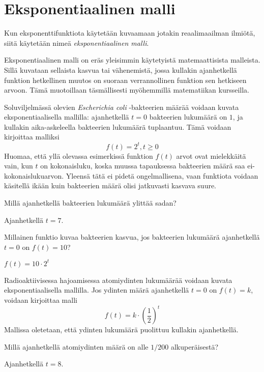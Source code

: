 \section{Eksponentiaalinen malli}

Kun eksponenttifunktiota käytetään kuvaamaan jotakin reaalimaailman
ilmiötä, siitä käytetään nimeä \emph{eksponentiaalinen malli}.

Eksponentiaalinen malli on eräs yleisimmin käytetyistä matemaattisista
malleista. Sillä kuvataan sellaista kasvua tai vähenemistä, jossa
kullakin ajanhetkellä funktion hetkellinen muutos on suoraan
verrannollinen funktion sen hetkiseen arvoon. Tämä muotoillaan
täsmällisesti myöhemmillä matematiikan kursseilla.

\begin{esimerkki}
Soluviljelmässä olevien \emph{Escherichia coli} -bakteerien
määrää voidaan kuvata eksponentiaalisella mallilla: ajanhetkellä
$t = 0$ bakteerien lukumäärä on $1$, ja kullakin aika-askeleella
bakteerien lukumäärä tuplaantuu. Tämä voidaan
kirjoittaa malliksi
\[
f(t) = 2^t, t \ge 0
\]
Huomaa, että yllä olevassa esimerkissä funktion $f(t)$ arvot ovat
mielekkäitä vain, kun $t$ on kokonaisluku, koska
muussa tapauksessa bakteerien määrä saa ei-kokonaislukuarvon.
Yleensä tätä ei pidetä ongelmallisena, vaan funktiota voidaan käsitellä
ikään kuin bakteerien määrä olisi jatkuvasti kasvava suure.
\end{esimerkki}

\begin{tehtava}
Millä ajanhetkellä bakteerien lukumäärä ylittää sadan?
\begin{vastaus}
Ajanhetkellä $t = 7$.
\end{vastaus}
\end{tehtava}

\begin{tehtava}
Millainen funktio kuvaa bakteerien kasvua, jos bakteerien lukumäärä
ajanhetkellä $t = 0$ on $f(t) = 10$?
\begin{vastaus}
$f(t) = 10 \cdot 2^t$
\end{vastaus}
\end{tehtava}

\begin{esimerkki}
Radioaktiivisessa hajoamisessa atomiydinten lukumäärää voidaan
kuvata eksponentiaalisella mallilla. Jos ydinten määrä ajanhetkellä
$t = 0$ on $f(t) = k$, voidaan kirjoittaa malli
\[
f(t) = k \cdot \left( \frac{1}{2} \right)^t
\]
Mallissa oletetaan, että ydinten lukumäärä puolittuu kullakin ajanhetkellä.
\end{esimerkki}

\begin{tehtava}
Millä ajanhetkellä atomiydinten määrä on alle $1/200$ alkuperäisestä?
\begin{vastaus}
Ajanhetkellä $t = 8$.
\end{vastaus}
\end{tehtava}
